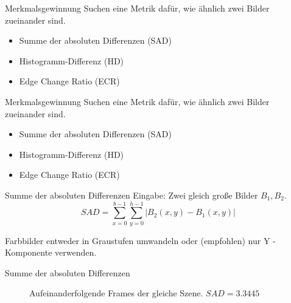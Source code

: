 \documentclass[11pt]{beamer}
\begin{document}
\begin{frame}{Merkmalsgewinnung}
Suchen eine Metrik dafür, wie ähnlich zwei Bilder zueinander sind.
\begin{itemize}
\item Summe der absoluten Differenzen (SAD)
\item Histogramm-Differenz (HD)
\item  Edge Change Ratio (ECR)
\end{itemize}
\end{frame}

\begin{frame}{Merkmalsgewinnung}
Suchen eine Metrik dafür, wie ähnlich zwei Bilder zueinander sind.
\begin{itemize}
\item Summe der absoluten Differenzen (SAD)
\item Histogramm-Differenz (HD)
\item  Edge Change Ratio (ECR)
\end{itemize}
\end{frame}

\begin{frame}{Summe der absoluten Differenzen}
Eingabe: Zwei gleich große Bilder $B_1, B_2$. 
\[ SAD = \sum_{x=0}^{b-1} \sum_{y=0}^{h-1} | B_2(x,y) - B_1(x,y) | \]

Farbbilder entweder in Graustufen umwandeln oder (empfohlen) nur Y - Komponente verwenden. 
\end{frame}

\begin{frame}{Summe der absoluten Differenzen}
\begin{figure}
\caption{Aufeinanderfolgende Frames der gleiche Szene. $SAD = 3.3445$} 
\end{figure} 
\end{frame}
\end{document}
